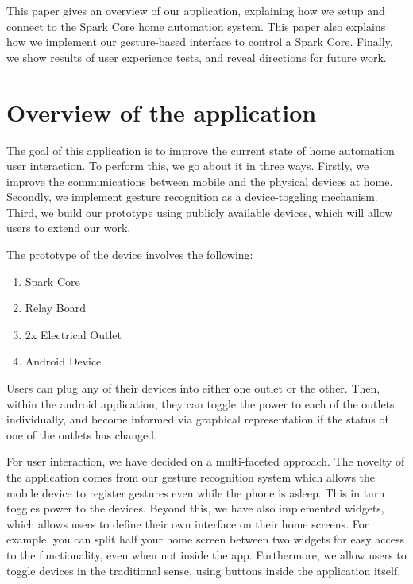 \documentclass[journal]{IEEEtran}
\begin{document}
This paper gives an overview of our application, explaining how we setup and connect to the Spark Core\cite{sparkio} home automation system. This paper also explains how we implement our gesture-based interface to control a Spark Core. Finally, we  show results of user experience tests, and reveal directions for future work.
	
\section{Overview of the application}
The goal of this application is to improve the current state of home automation user interaction. To perform this, we go about it in three ways. Firstly, we improve the communications between mobile and the physical devices at home. Secondly, we implement gesture recognition as a device-toggling mechanism. Third, we build our prototype using publicly available devices, which will allow users to extend our work.  

The prototype of the device involves the following:
\begin{enumerate}
	\item Spark Core
	\item Relay Board
	\item 2x Electrical Outlet
	\item Android Device
\end{enumerate}

Users can plug any of their devices into either one outlet or the other. Then, within the android application, they can toggle the power to each of the outlets individually, and become informed via graphical representation if the status of one of the outlets has changed.

For user interaction, we have decided on a multi-faceted approach. The novelty of the application comes from our gesture recognition system which allows the mobile device to register gestures even while the phone is asleep. This in turn toggles power to the devices.  Beyond this, we have also implemented widgets, which allows users to define their own interface on their home screens. For example, you can split half your home screen between two widgets for easy access to the functionality, even when not inside the app. Furthermore, we allow users to toggle devices in the traditional sense, using buttons inside the application itself. 
\end{document}
